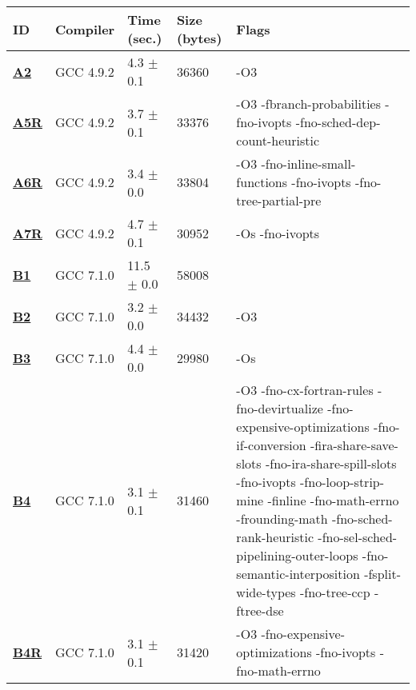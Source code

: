     \begin{tabular}{|l|l|l|l|p{3.2in}|}
     \hline
      \textbf{ID} & \textbf{Compiler} & \textbf{Time (sec.)} & \textbf{Size (bytes)} & \textbf{Flags} \\ 
     \hline
      \textbf{ \href{http://cknowledge.org/repo/web.php?wcid=experiment:0b867dd820354a8b\&subpoint=5734f47e4214a783}{A2} } &  GCC 4.9.2  &  4.3 $\pm$ 0.1  &  36360  & {\small -O3 }\\
     \hline
      \textbf{ \href{http://cknowledge.org/repo/web.php?wcid=experiment:984b2d8abc3c4415\&subpoint=78c281b4cab897a6}{A5R} } &  GCC 4.9.2  &  3.7 $\pm$ 0.1  &  33376  & {\small -O3 -fbranch-probabilities -fno-ivopts -fno-sched-dep-count-heuristic }\\
     \hline
      \textbf{ \href{http://cknowledge.org/repo/web.php?wcid=experiment:7af17ca204080b57\&subpoint=5a464ecf81b60098}{A6R} } &  GCC 4.9.2  &  3.4 $\pm$ 0.0  &  33804  & {\small -O3 -fno-inline-small-functions -fno-ivopts -fno-tree-partial-pre }\\
     \hline
      \textbf{ \href{http://cknowledge.org/repo/web.php?wcid=experiment:992855e25efa2c4a\&subpoint=c6b45e2c3e414452}{A7R} } &  GCC 4.9.2  &  4.7 $\pm$ 0.1  &  30952  & {\small -Os -fno-ivopts }\\
     \hline
      \textbf{ \href{http://cknowledge.org/repo/web.php?wcid=experiment:ea8ded6ddee6093a\&subpoint=6006d3eadf403088}{B1} } &  GCC 7.1.0  &  11.5 $\pm$ 0.0  &  58008  & {\small  }\\
     \hline
      \textbf{ \href{http://cknowledge.org/repo/web.php?wcid=experiment:00fa4e108053ac7b\&subpoint=de68bdc517447085}{B2} } &  GCC 7.1.0  &  3.2 $\pm$ 0.0  &  34432  & {\small -O3 }\\
     \hline
      \textbf{ \href{http://cknowledge.org/repo/web.php?wcid=experiment:eeba1f30493b8bd4\&subpoint=5d64cf89c67817be}{B3} } &  GCC 7.1.0  &  4.4 $\pm$ 0.0  &  29980  & {\small -Os }\\
     \hline
      \textbf{ \href{http://cknowledge.org/repo/web.php?wcid=experiment:f4f13d284194463a\&subpoint=5421ba4fdca2c4b6}{B4} } &  GCC 7.1.0  &  3.1 $\pm$ 0.1  &  31460  & {\small -O3 -fno-cx-fortran-rules -fno-devirtualize -fno-expensive-optimizations -fno-if-conversion -fira-share-save-slots -fno-ira-share-spill-slots -fno-ivopts -fno-loop-strip-mine -finline -fno-math-errno -frounding-math -fno-sched-rank-heuristic -fno-sel-sched-pipelining-outer-loops -fno-semantic-interposition -fsplit-wide-types -fno-tree-ccp -ftree-dse }\\
     \hline
      \textbf{ \href{http://cknowledge.org/repo/web.php?wcid=experiment:2b6646924c79bf81\&subpoint=e8a36aa042438771}{B4R} } &  GCC 7.1.0  &  3.1 $\pm$ 0.1  &  31420  & {\small -O3 -fno-expensive-optimizations -fno-ivopts -fno-math-errno }\\
     \hline
    \end{tabular}    
